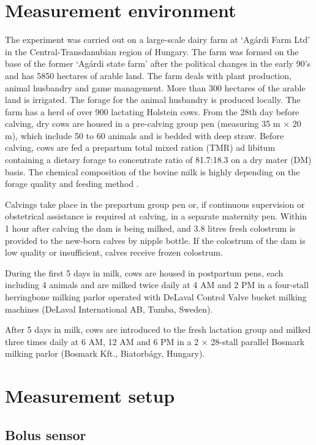 \documentclass[conference]{IEEEtran}
\begin{document}
\section{Measurement environment}

The experiment was carried out on a large-scale dairy farm at ‘Agárdi Farm Ltd’ in the Central-Transdanubian region of Hungary. The farm was formed on the base of the former ‘Agárdi state farm’ after the political changes in the early 90’s and has 5850 hectares of arable land. The farm deals with plant production, animal husbandry and game management. More than 300 hectares of the arable land is irrigated. The forage for the animal husbandry is produced locally.
The farm has a herd of over 900 lactating Holstein cows. From the 28th day before calving, dry cows are housed in a pre-calving group pen (measuring 35 m × 20 m), which include 50 to 60 animals and is bedded with deep straw. Before calving, cows are fed a prepartum total mixed ration (TMR) ad libitum containing a dietary forage to concentrate ratio of 81.7:18.3 on a dry mater (DM) basis. The chemical composition of the bovine milk is highly depending on the forage quality and feeding method \cite{aidin2019}.

Calvings take place in the prepartum group pen or, if continuous supervision or obstetrical assistance is required at calving, in a separate maternity pen. Within 1 hour after calving the dam is being milked, and 3.8 litres fresh colostrum is provided to the new-born calves by nipple bottle. If the colostrum of the dam is low quality or insufficient, calves receive frozen colostrum.

During the first 5 days in milk, cows are housed in postpartum pens, each including 4 animals and are milked twice daily at 4 AM and 2 PM in a four-stall herringbone milking parlor operated with DeLaval Control Valve bucket milking machines (DeLaval International AB, Tumba, Sweden).

After 5 days in milk, cows are introduced to the fresh lactation group and milked three times daily at 6 AM, 12 AM and 6 PM in a 2 × 28-stall parallel Bosmark milking parlor (Bosmark Kft., Biatorbágy, Hungary).

\section{Measurement setup}

\subsection{Bolus sensor}
\end{document}
